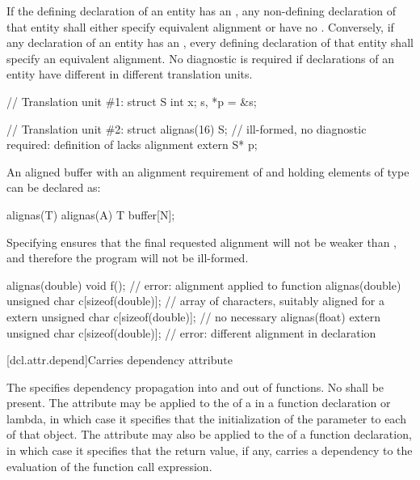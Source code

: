 \pnum
If the defining declaration of an entity has an
, any non-defining
declaration of that entity shall either specify equivalent alignment or have no
.
Conversely, if any declaration of an entity has an
,
every defining
declaration of that entity shall specify an equivalent alignment.
No diagnostic is required if declarations of an entity have
different 
in different translation units.
\begin{example}
\begin{codeblock}
// Translation unit \#1:
struct S { int x; } s, *p = &s;

// Translation unit \#2:
struct alignas(16) S;           // ill-formed, no diagnostic required: definition of  lacks alignment
extern S* p;
\end{codeblock}
\end{example}

\pnum
\begin{example}
An aligned buffer with an alignment requirement
of  and holding  elements of type 
can be declared as:
\begin{codeblock}
alignas(T) alignas(A) T buffer[N];
\end{codeblock}
Specifying  ensures
that the final requested alignment will not be weaker than ,
and therefore the program will not be ill-formed.
\end{example}

\pnum
\begin{example}
\begin{codeblock}
alignas(double) void f();                           // error: alignment applied to function
alignas(double) unsigned char c[sizeof(double)];    // array of characters, suitably aligned for a 
extern unsigned char c[sizeof(double)];             // no  necessary
alignas(float)
  extern unsigned char c[sizeof(double)];           // error: different alignment in declaration
\end{codeblock}
\end{example}

[dcl.attr.depend]{Carries dependency attribute}%

\pnum
The   specifies
dependency propagation into and out of functions.
No
 shall be present. The attribute may be
applied to the  of a
 in a function declaration or lambda, in
which case it specifies that the initialization of the parameter
 to each  of that object. The attribute may also be applied
to the  of a function declaration, in which case it
specifies that the return value, if any, carries a dependency to the evaluation
of the function call expression.

